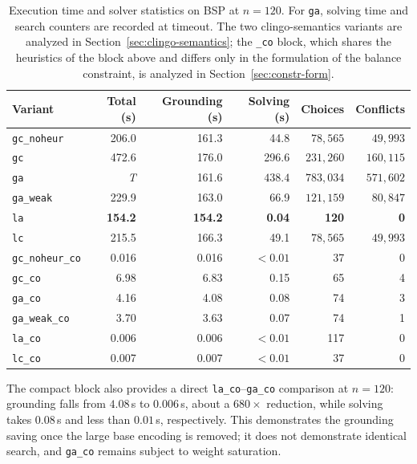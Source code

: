 \begin{table}[H]
\centering
\small
\begin{tabular}{lrrrrr}
\toprule
\textbf{Variant} & \textbf{Total (s)} & \textbf{Grounding (s)} & \textbf{Solving (s)} & \textbf{Choices} & \textbf{Conflicts}\\
\midrule
\texttt{gc\_noheur} & 206.0 & 161.3 & 44.8 & $78{,}565$ & $49{,}993$\\
\texttt{gc}        & 472.6 & 176.0 & 296.6 & $231{,}260$ & $160{,}115$\\
\texttt{ga}        & \emph{T} & 161.6 & $438.4$ & $783{,}034$ & $571{,}602$\\
\texttt{ga\_weak}   & 229.9 & 163.0 & 66.9 & $121{,}159$ & $80{,}847$\\
\texttt{la}        & \textbf{154.2} & \textbf{154.2} & \textbf{0.04} & \textbf{120} & \textbf{0}\\
\texttt{lc}        & 215.5 & 166.3 & 49.1 & $78{,}565$ & $49{,}993$\\
\midrule[\lightrulewidth]
\texttt{gc\_noheur\_co} & 0.016 & 0.016 & $<0.01$ & 37 & 0\\
\texttt{gc\_co}     & 6.98 & 6.83 & 0.15 & 65 & 4\\
\texttt{ga\_co}     & 4.16 & 4.08 & 0.08 & 74 & 3\\
\texttt{ga\_weak\_co} & 3.70 & 3.63 & 0.07 & 74 & 1\\
\texttt{la\_co}     & 0.006 & 0.006 & $<0.01$ & 117 & 0\\
\texttt{lc\_co}     & 0.007 & 0.007 & $<0.01$ & 37 & 0\\
\bottomrule
\end{tabular}
\caption{Execution time and solver statistics on BSP at $n=120$. For \texttt{ga}, solving time and search counters are recorded at timeout. The two clingo-semantics variants are analyzed in Section~\ref{sec:clingo-semantics}; the \texttt{\_co} block, which shares the heuristics of the block above and differs only in the formulation of the balance constraint, is analyzed in Section~\ref{sec:constr-form}.}
\label{tab:bsp-n120}
\end{table}

The compact block also provides a direct \texttt{la\_co}--\texttt{ga\_co} comparison at $n=120$: grounding falls from $4.08$\,s to $0.006$\,s, about a $680\times$ reduction, while solving takes $0.08$\,s and less than $0.01$\,s, respectively. This demonstrates the grounding saving once the large base encoding is removed; it does not demonstrate identical search, and \texttt{ga\_co} remains subject to weight saturation.

